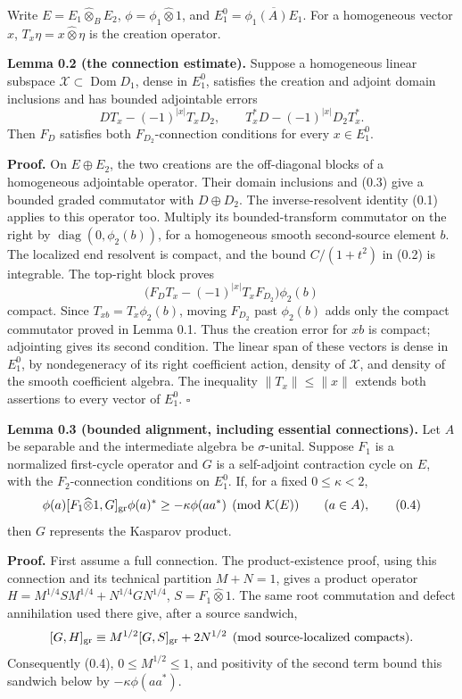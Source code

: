 \documentclass[
  11pt,
]{article}
\begin{document}
Write \(E=E_1\widehat\otimes_B E_2\), \(\phi=\phi_1\widehat\otimes1\),
and \(E_1^0=\overline{\phi_1(A)E_1}\). For a homogeneous vector \(x\),
\(T_x\eta=x\widehat\otimes\eta\) is the creation operator.

\textbf{Lemma 0.2 (the connection estimate).} Suppose a homogeneous
linear subspace \(\mathcal X\subset\operatorname{Dom}D_1\), dense in
\(E_1^0\), satisfies the creation and adjoint domain inclusions and has
bounded adjointable errors \[
DT_x-(-1)^{|x|}T_xD_2,\qquad
T_x^*D-(-1)^{|x|}D_2T_x^*.
\tag{0.3}
\] Then \(F_D\) satisfies both \(F_{D_2}\)-connection conditions for
every \(x\in E_1^0\).

\textbf{Proof.} On \(E\oplus E_2\), the two creations are the
off-diagonal blocks of a homogeneous adjointable operator. Their domain
inclusions and (0.3) give a bounded graded commutator with
\(D\oplus D_2\). The inverse-resolvent identity (0.1) applies to this
operator too. Multiply its bounded-transform commutator on the right by
\(\operatorname{diag}(0,\phi_2(b))\), for a homogeneous smooth
second-source element \(b\). The localized end resolvent is compact, and
the bound \(C/(1+t^2)\) in (0.2) is integrable. The top-right block
proves \[
\bigl(F_DT_x-(-1)^{|x|}T_xF_{D_2}\bigr)\phi_2(b)
\] compact. Since \(T_{xb}=T_x\phi_2(b)\), moving \(F_{D_2}\) past
\(\phi_2(b)\) adds only the compact commutator proved in Lemma 0.1. Thus
the creation error for \(xb\) is compact; adjointing gives its second
condition. The linear span of these vectors is dense in \(E_1^0\), by
nondegeneracy of its right coefficient action, density of
\(\mathcal X\), and density of the smooth coefficient algebra. The
inequality \(\|T_x\|\leq\|x\|\) extends both assertions to every vector
of \(E_1^0\). \(\square\)

\textbf{Lemma 0.3 (bounded alignment, including essential connections).}
Let \(A\) be separable and the intermediate algebra be
\(\sigma\)-unital. Suppose \(F_1\) is a normalized first-cycle operator
and \(G\) is a self-adjoint contraction cycle on \(E\), with the
\(F_2\)-connection conditions on \(E_1^0\). If, for a fixed
\(0\leq\kappa<2\), \[
\phi(a)[F_1\widehat\otimes1,G]_{\rm gr}\phi(a)^*
\geq-\kappa\phi(aa^*)\pmod{\mathcal K(E)}
\qquad(a\in A),
\tag{0.4}
\] then \(G\) represents the Kasparov product.

\textbf{Proof.} First assume a full connection. The product-existence
proof, using this connection and its technical partition \(M+N=1\),
gives a product operator \(H=M^{1/4}SM^{1/4}+N^{1/4}GN^{1/4}\),
\(S=F_1\widehat\otimes1\). The same root commutation and defect
annihilation used there give, after a source sandwich, \[
[G,H]_{\rm gr}
\equiv M^{1/2}[G,S]_{\rm gr}+2N^{1/2}
\pmod{\text{source-localized compacts}}.
\] Consequently (0.4), \(0\leq M^{1/2}\leq1\), and positivity of the
second term bound this sandwich below by \(-\kappa\phi(aa^*)\).
\end{document}
